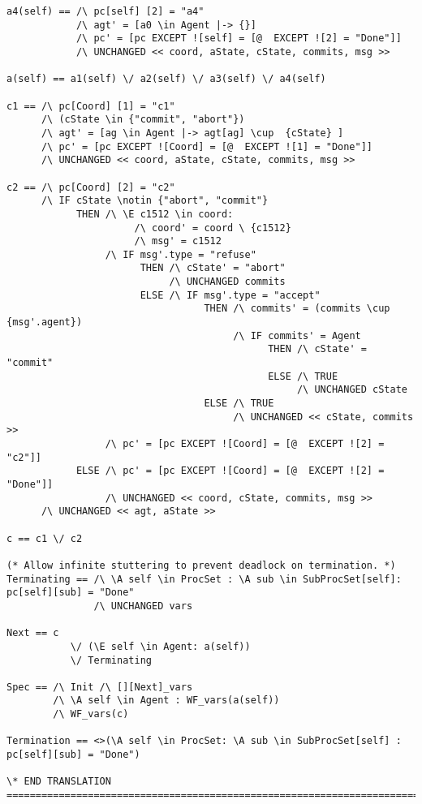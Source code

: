 \documentclass{thesul}
\begin{document}
\begin{appendices}
\begin{lstlisting}[caption = TLA+ translation for Sub-Processes, frame = tlrb, firstnumber = 1]
a4(self) == /\ pc[self] [2] = "a4"
            /\ agt' = [a0 \in Agent |-> {}]
            /\ pc' = [pc EXCEPT ![self] = [@  EXCEPT ![2] = "Done"]]
            /\ UNCHANGED << coord, aState, cState, commits, msg >>

a(self) == a1(self) \/ a2(self) \/ a3(self) \/ a4(self)

c1 == /\ pc[Coord] [1] = "c1"
      /\ (cState \in {"commit", "abort"})
      /\ agt' = [ag \in Agent |-> agt[ag] \cup  {cState} ]
      /\ pc' = [pc EXCEPT ![Coord] = [@  EXCEPT ![1] = "Done"]]
      /\ UNCHANGED << coord, aState, cState, commits, msg >>

c2 == /\ pc[Coord] [2] = "c2"
      /\ IF cState \notin {"abort", "commit"}
            THEN /\ \E c1512 \in coord:
                      /\ coord' = coord \ {c1512}
                      /\ msg' = c1512
                 /\ IF msg'.type = "refuse"
                       THEN /\ cState' = "abort"
                            /\ UNCHANGED commits
                       ELSE /\ IF msg'.type = "accept"
                                  THEN /\ commits' = (commits \cup {msg'.agent})
                                       /\ IF commits' = Agent
                                             THEN /\ cState' = "commit"
                                             ELSE /\ TRUE
                                                  /\ UNCHANGED cState
                                  ELSE /\ TRUE
                                       /\ UNCHANGED << cState, commits >>
                 /\ pc' = [pc EXCEPT ![Coord] = [@  EXCEPT ![2] = "c2"]]
            ELSE /\ pc' = [pc EXCEPT ![Coord] = [@  EXCEPT ![2] = "Done"]]
                 /\ UNCHANGED << coord, cState, commits, msg >>
      /\ UNCHANGED << agt, aState >>

c == c1 \/ c2

(* Allow infinite stuttering to prevent deadlock on termination. *)
Terminating == /\ \A self \in ProcSet : \A sub \in SubProcSet[self]: pc[self][sub] = "Done"
               /\ UNCHANGED vars

Next == c
           \/ (\E self \in Agent: a(self))
           \/ Terminating

Spec == /\ Init /\ [][Next]_vars
        /\ \A self \in Agent : WF_vars(a(self))
        /\ WF_vars(c)

Termination == <>(\A self \in ProcSet: \A sub \in SubProcSet[self] : pc[self][sub] = "Done")

\* END TRANSLATION
=============================================================================


\end{lstlisting}
\end{appendices}
\end{document}
